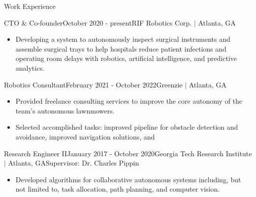 \documentclass{resume} %
\newcommand{\sectionspace}{\vspace{3mm}}
\begin{document}

\sectionspace
\begin{rSection}{Work Experience}

\begin{rSubsection}{CTO \& Co-founder}{October 2020 - present}{RIF Robotics Corp. $\vert$ Atlanta, GA}{}

\item
\begin{itemize}

\item Developing a system to autonomously inspect surgical instruments and
  assemble surgical trays to help hospitals reduce patient infections and
  operating room delays with robotics, artificial intelligence, and predictive
  analytics.

\end{itemize}

\end{rSubsection}


\begin{rSubsection}{Robotics Consultant}{February 2021 - October 2022}{Greenzie $\vert$ Atlanta, GA}{}

\item
\begin{itemize}
\item Provided freelance consulting services to improve the core autonomy of the
  team's autonomous lawnmowers.

\item Selected accomplished tasks: improved pipeline for obstacle detection and
  avoidance, improved navigation solutions, and

\end{itemize}

\end{rSubsection}


\begin{rSubsection}{Research Engineer II}{January 2017 - October 2020}{Georgia Tech Research Institute $\vert$ Atlanta, GA}{Supervisor: Dr. Charles Pippin}

\item
\begin{itemize}
\item Developed algorithms for collaborative autonomous systems including, but
  not limited to, task allocation, path planning, and computer vision.


\end{itemize}
\end{rSubsection}
\end{rSection}
\end{document}
